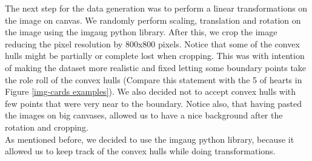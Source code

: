 \documentclass[a4paper]{article}
\begin{document}
\newline \newline\newline 
\noindent The next step for the data generation was to perform a linear transformations on the image on canvas.  We randomly perform scaling, translation and rotation on the image using the imgaug python library.  After this, we crop the image reducing the pixel resolution by 800x800 pixels.  Notice that some of the convex hulls might be partially or complete lost when cropping.  This was with intention of making the dataset more realistic and fixed letting some boundary points take the role roll of the convex hulls (Compare this statement with the 5 of hearts in Figure \ref{img-cards examples}).   We also decided not to accept convex hulls with few points that were very near to the boundary.
Notice also, that having pasted the images on big canvases, allowed us to have a nice background after the rotation and cropping.\\
As mentioned before, we decided to use the imgaug python library, because it allowed us to keep track of the convex hulls while doing transformations.
\end{document}

